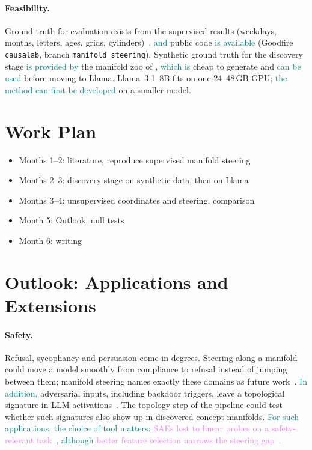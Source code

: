\documentclass[11pt,a4paper]{article}
\newcommand{\todo}[1]{\textbf{\textcolor{red}{[TODO: #1]}}}
\newcommand{\fromnotes}[1]{\textcolor{green!50!black}{#1}}
\newcommand{\fromold}[1]{\textcolor{violet}{#1}}
\newcommand{\fromclaude}[1]{\textcolor{orange!85!black}{#1}}
\newcommand{\fromprose}[1]{\textcolor{teal}{#1}}
\newcommand{\todo}[1]{\ifhmode\unskip\fi} %
\newcommand{\fromnotes}[1]{#1}
\newcommand{\fromold}[1]{#1}
\newcommand{\fromclaude}[1]{#1}
\newcommand{\fromprose}[1]{#1}
\begin{document}
\paragraph{Feasibility.}
\fromnotes{Ground truth for evaluation exists from the supervised results (weekdays, months, letters, ages, grids, cylinders)~\cite{wurgaft2026manifoldsteering}\fromprose{, and} public code \fromprose{is available} (Goodfire \texttt{causalab}, branch \texttt{manifold\_steering}).}
\fromclaude{Synthetic ground truth for the discovery stage \fromprose{is provided by} the manifold zoo of \textcite{bhalla2026saemanifolds}, \fromprose{which is} cheap to generate and \fromprose{can be used} before moving to Llama.}
\fromnotes{Llama~3.1~8B fits on one 24--48\,GB GPU; \fromprose{the method can first be developed} on a smaller model.}

\section{Work Plan}

\begin{itemize}
  \item Months 1--2: literature, reproduce supervised manifold steering
  \item Months 2--3: discovery stage on synthetic data, then on Llama
  \item Months 3--4: unsupervised coordinates and steering, comparison
  \item Month 5: Outlook, null tests
  \item Month 6: writing
\end{itemize}

\section{Outlook: Applications and Extensions}\label{sec:outlook}

\paragraph{Safety.}
\fromclaude{Refusal, sycophancy and persuasion come in degrees. Steering along a manifold could move a model smoothly from compliance to refusal instead of jumping between them; manifold steering names exactly these domains as future work~\cite{wurgaft2026manifoldsteering}.}
\fromclaude{\fromprose{In addition,} adversarial inputs, including backdoor triggers, leave a topological signature in LLM activations~\cite{fay2026shape}. The topology step of the pipeline could test whether such signatures also show up in discovered concept manifolds.}
\fromprose{For such applications, the choice of tool matters:} \fromold{SAEs lost to linear probes on a safety-relevant task~\cite{gdm2025negative}\fromprose{, although} better feature selection narrows the steering gap~\cite{arad2025steering}.}
\end{document}
